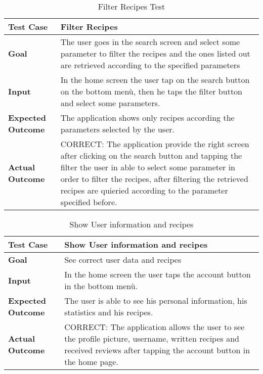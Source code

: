 \begin{table}[H]
	\centering
	\begin{tabular}{ll}
	\hline
	\textbf{Test Case}& Filter Recipes\\
	\hline
	\textbf{Goal}& The user goes in the search screen and select some parameter to filter the recipes and the ones listed out are retrieved according to the specified parameters\\
	\hline
	\textbf{Input}& In the home screen the user tap on the search button on the bottom menù, then he taps the filter button and select some parameters.\\
	\hline
	\textbf{Expected Outcome}& The application shows only recipes according the parameters selected by the user.\\
	\hline
	\textbf{Actual Outcome}& CORRECT: The application provide the right screen after clicking on the search button and tapping the filter the user in able to select some parameter in order to filter the recipes, after filtering the retrieved recipes are quieried according to the parameter specified before.\\
	\hline	
	\end{tabular}
	\caption{Filter Recipes Test}
\end{table}

\begin{table}[H]
	\centering
	\begin{tabular}{ll}
	\hline
	\textbf{Test Case}& Show User information and recipes\\
	\hline
	\textbf{Goal}& See correct user data and recipes\\
	\hline
	\textbf{Input}& In the home screen the user taps the account button in the bottom menù.\\
	\hline
	\textbf{Expected Outcome}& The user is able to see his personal information, his statistics and his recipes.\\
	\hline
	\textbf{Actual Outcome}& CORRECT: The application allows the user to see the profile picture, username, written recipes and received reviews after tapping the account button in the home page.\\
	\hline	
	\end{tabular}
	\caption{Show User information and recipes}
\end{table}